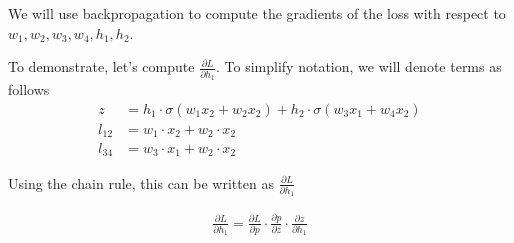 \documentclass[11pt]{article}
\begin{document}
We will use backpropagation to compute the gradients of the loss with respect to $w_1, w_2, w_3, w_4, h_1, h_2$.


To demonstrate, let's compute $\frac{\partial L}{\partial h_1}$. To simplify notation, we will denote terms as follows
\begin{align*}
    z &= h_1 \cdot \sigma(w_1 x_2 + w_2 x_2) + h_2\cdot\sigma(w_3 x_1 + w_4 x_2)\\
    l_{12} &= w_1 \cdot x_2 + w_2 \cdot x_2\\
    l_{34} &= w_3 \cdot x_1 + w_2 \cdot x_2
\end{align*}


Using the chain rule, this can be written as $\frac{\partial L}{\partial h_1}$

\begin{align*}
    \frac{\partial L}{\partial h_1} = \frac{\partial L}{\partial p} \cdot \frac{\partial p}{\partial z} \cdot \frac{\partial z}{\partial h_1}
\end{align*}
\end{document}
